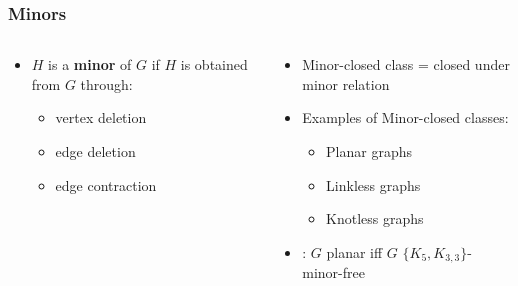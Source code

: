 \documentclass[english]{beamer}
\begin{document}
\begin{frame}
  \frametitle{Minors}
  \begin{columns}
    \begin{column}{0.5\textwidth}
      \begin{itemize}
        \item $H$ is a \textbf{minor} of $G$ if $H$ is obtained from $G$ through:
              \begin{itemize}
                \item vertex deletion
                \item edge deletion
                \item edge contraction
              \end{itemize}
              \begin{figure}
                \centering
                
              \end{figure}
      \end{itemize}
    \end{column}
    \pause
    \begin{column}{0.5\textwidth}
      \begin{itemize}
        \item Minor-closed class = closed under minor relation
        \item Examples of Minor-closed classes:
              \begin{itemize}
                \item Planar graphs
                \item Linkless graphs
                \item Knotless graphs
              \end{itemize}
        \item \cite{kuratowskiProblemeCourbesGauches1930,wagnerUeberEigenschaftEbenen1937}: $G$ planar iff $G$ $\{K_5, K_{3,3}\}$-minor-free
      \end{itemize}
    \end{column}
  \end{columns}
\end{frame}
\end{document}
